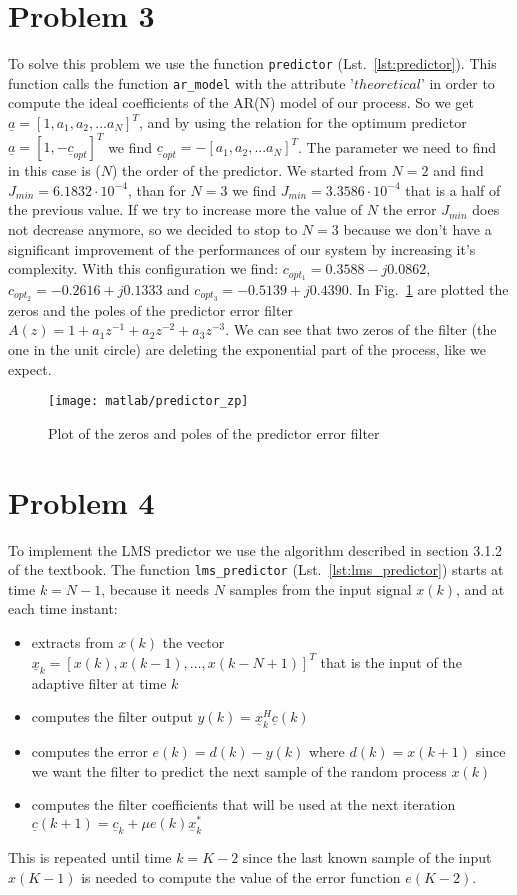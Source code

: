 \documentclass{article}
\newcommand{\inlinecode}[1]{\lstinline[basicstyle=\ttfamily,
    keywordstyle={}]{#1}}
\renewcommand{\vec}[1]{\underline{#1}}
\begin{document}
\section*{Problem 3}
To solve this problem we use the function \inlinecode{predictor} (Lst.~\ref{lst:predictor}). This function calls the function \inlinecode{ar_model} with the attribute '$theoretical$' in order to compute the ideal coefficients of the AR(N) model of our process. So we get $ \vec{a} = [1, a_1, a_2,...a_N]^T $, and by using the relation for the optimum predictor $ \vec{a} = [1,-\vec{c}_{opt}]^T $ we find $ \vec{c}_{opt} = -[a_1, a_2,...a_N]^T$. The parameter we need to find in this case is ($N$) the order of the predictor. We started from $N=2$ and find $J_{min} = 6.1832\cdot10^{-4}$, than for $N=3$ we find $J_{min} = 3.3586\cdot10^{-4}$ that is a half of the previous value. If we try to increase more the value of $N$ the error $J_{min}$ does not decrease anymore, so we decided to stop to $N=3$ because we don't have a significant improvement of the performances of our system by increasing it's complexity.
With this configuration we find: $c_{opt_1} = 0.3588 -j0.0862$,  $c_{opt_2} = -0.2616 +j0.1333$ and $c_{opt_3} = -0.5139 +j0.4390$.
\newline In Fig.~\ref{plot:predictor_zp} are plotted the zeros and the poles of the predictor error filter $A(z) = 1+a_1 z^{-1} + a_2 z^{-2} + a_3 z^{-3}$.
We can see that two zeros of the filter (the one in the unit circle) are deleting the exponential part of the process, like we expect. 
\begin{figure}[htbp]
  \centering
  \texttt{[image: matlab/predictor\_zp]}
  \caption{Plot of the zeros and poles of the predictor error filter}
  \label{plot:predictor_zp}
\end{figure}
\section*{Problem 4}
To implement the LMS predictor we use the algorithm described in
section 3.1.2 of the textbook. The function \inlinecode{lms_predictor}
(Lst.~\ref{lst:lms_predictor}) starts at time $k=N-1$, because it
needs $N$ samples from the input signal $x(k)$, and at each
time instant:
\begin{itemize}
  \item extracts from $x(k)$ the vector $\vec{x}_k = [x(k),
    x(k-1),\dots,x(k-N+1)]^T$ that is the input of the adaptive filter
    at time $k$
  \item computes the filter output $y(k) = \vec{x}_k^H\vec{c}(k)$
  \item computes the error $e(k) = d(k) - y(k)$ where $d(k) = x(k+1)$
    since we want the filter to predict the next sample of the random
    process $x(k)$
  \item computes the filter coefficients that will be used at the next
    iteration $\vec{c}(k+1) = \vec{c}_k + \mu e(k) \vec{x}_k^*$
\end{itemize}
This is repeated until time $k = K - 2$ since the last known sample of
the input $x(K-1)$ is needed to compute the value of the error
function $e(K-2)$.
\end{document}
